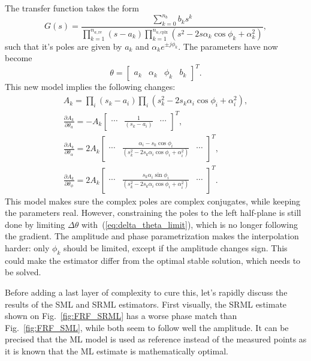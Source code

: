 The transfer function takes the form
\begin{equation}
    G(s) = \frac{\sum_{k=0}^{n_b} b_k s^k}{\prod_{k=1}^{n_{a, \text{re}}} (s-a_k) \prod_{k=1}^{n_{a, \text{cplx}}} (s^2 - 2 s \alpha_k \cos \phi_k + \alpha_k^2)},
    \label{eq:TF_SRML}
\end{equation}
such that it's poles are given by $a_k$ and $\alpha_k e^{\pm j \phi_k}$. The parameters have now become 
\begin{equation}
    \theta = \begin{bmatrix}
        a_k & \alpha_k & \phi_k & b_k
    \end{bmatrix}^T.
    \label{eq:theta_SRML}
\end{equation}
This new model implies the following changes:
\begin{gather}
    A_k = \prod_{i} (s_k-a_i) \prod_{i} (s_k^2 - 2 s_k \alpha_i \cos \phi_i + \alpha_i^2),\\
    \frac{\partial A_k}{\partial \theta_a} = -A_k \begin{bmatrix}
        \cdots & \frac{1}{(s_k-a_i)} & \cdots
    \end{bmatrix}^T,\\
    \frac{\partial A_k}{\partial \theta_\alpha} = 2 A_k \begin{bmatrix}
        \cdots & \frac{\alpha_i - s_k \cos \phi_i}{(s_k^2 - 2 s_k \alpha_i \cos \phi_i + \alpha_i^2)} & \cdots
    \end{bmatrix}^T, \\
    \frac{\partial A_k}{\partial \theta_\phi} = 2 A_k \begin{bmatrix}
        \cdots & \frac{s_k \alpha_i \sin \phi_i}{(s_k^2 - 2 s_k \alpha_i \cos \phi_i + \alpha_i^2)} & \cdots
    \end{bmatrix}^T.
\end{gather}
This model makes sure the complex poles are complex conjugates, while keeping the parameters real. However, constraining the poles to the left half-plane is still done by limiting $\Delta \theta$ with~(\ref{eq:delta_theta_limit}), which is no longer following the gradient. The amplitude and phase parametrization makes the interpolation harder: only $\phi_k$ should be limited, except if the amplitude changes sign. This could make the estimator differ from the optimal stable solution, which needs to be solved.

Before adding a last layer of complexity to cure this, let's rapidly discuss the results of the SML and SRML estimators. First visually, the SRML estimate shown on Fig.~\ref{fig:FRF_SRML} has a worse phase match than Fig.~\ref{fig:FRF_SML}, while both seem to follow well the amplitude. It can be precised that the ML model is used as reference instead of the measured points as it is known that the ML estimate is mathematically optimal. 



